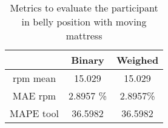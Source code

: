 \begin{table}
    \centering
    \begin{tabular}{|c|c|c|}
    \hline 
    & Binary & Weighed \\ 
    
    \hline 

    rpm mean   &  15.029 &  15.029 \\
    MAE rpm & 2.8957 \% &  2.8957\% \\
    MAPE tool  & 36.5982 & 36.5982 \\ 
    \hline 
    \end{tabular}
    
    \caption{Metrics to evaluate the participant in belly position with moving mattress}
    \label{tab:ProneNormalStillMetrics}
    \end{table}
    